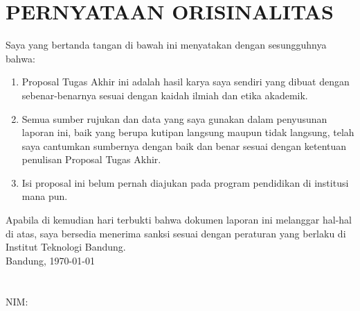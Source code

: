 \chapter*{PERNYATAAN ORISINALITAS}
\vspace{2cm}
Saya yang bertanda tangan di bawah ini menyatakan dengan sesungguhnya bahwa:
\begin{enumerate}
    \item Proposal Tugas Akhir ini adalah hasil karya saya sendiri yang dibuat dengan sebenar-benarnya sesuai dengan kaidah ilmiah dan etika akademik.
    \item Semua sumber rujukan dan data yang saya gunakan dalam penyusunan laporan ini, baik yang berupa kutipan langsung maupun tidak langsung, telah saya cantumkan sumbernya dengan baik dan benar sesuai dengan ketentuan penulisan Proposal Tugas Akhir.
    \item Isi proposal ini belum pernah diajukan pada program pendidikan di institusi mana pun.
\end{enumerate}
Apabila di kemudian hari terbukti bahwa dokumen laporan ini melanggar hal-hal di atas, saya bersedia menerima sanksi sesuai dengan peraturan yang berlaku di Institut Teknologi Bandung.
\\[2cm]
Bandung, \today\\
\\[2cm]

\underline{\namapenulis} \\
NIM: \nimpenulis
  